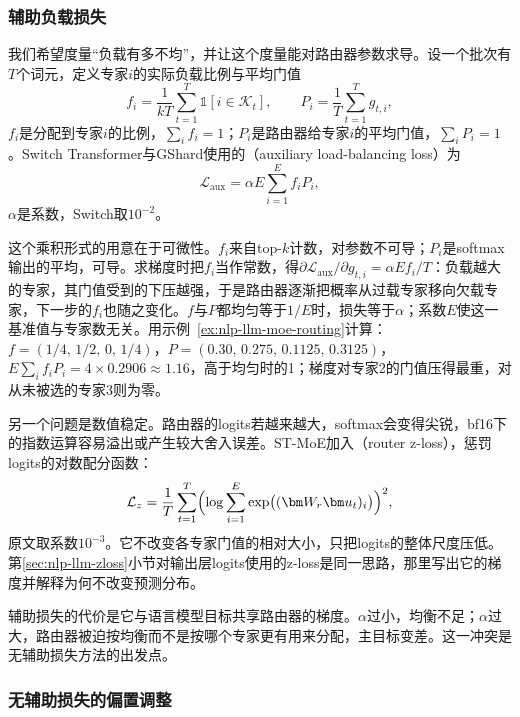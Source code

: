 \subsubsection{辅助负载损失}
\label{sec:nlp-llm-aux-loss}

我们希望度量“负载有多不均”，并让这个度量能对路由器参数求导。设一个批次有$T$个词元，定义专家$i$的实际负载比例与平均门值
\[
 f_i=\frac{1}{kT}\sum_{t=1}^{T}\mathbb 1[i\in\mathcal K_t],\qquad
 P_i=\frac1T\sum_{t=1}^{T}g_{t,i},
\]
$f_i$是分配到专家$i$的比例，$\sum_if_i=1$；$P_i$是路由器给专家$i$的平均门值，$\sum_iP_i=1$。Switch Transformer与GShard使用的（auxiliary load-balancing loss）为
\begin{equation}
 \mathcal L_{\mathrm{aux}}=\alpha E\sum_{i=1}^{E}f_iP_i ,
 \label{eq:nlp-llm-aux-loss}
\end{equation}
$\alpha$是系数，Switch取$10^{-2}$。

这个乘积形式的用意在于可微性。$f_i$来自top-$k$计数，对参数不可导；$P_i$是softmax输出的平均，可导。求梯度时把$f_i$当作常数，得$\partial\mathcal L_{\mathrm{aux}}/\partial g_{t,i}=\alpha Ef_i/T$：负载越大的专家，其门值受到的下压越强，于是路由器逐渐把概率从过载专家移向欠载专家，下一步的$f_i$也随之变化。$f$与$P$都均匀等于$1/E$时，损失等于$\alpha$；系数$E$使这一基准值与专家数无关。用示例~\ref{ex:nlp-llm-moe-routing}计算：$f=(1/4,\,1/2,\,0,\,1/4)$，$P=(0.30,\,0.275,\,0.1125,\,0.3125)$，$E\sum_if_iP_i=4\times0.2906\approx1.16$，高于均匀时的1；梯度对专家2的门值压得最重，对从未被选的专家3则为零。

另一个问题是数值稳定。路由器的logits若越来越大，softmax会变得尖锐，bf16下的指数运算容易溢出或产生较大舍入误差。ST-MoE加入（router z-loss），惩罚logits的对数配分函数：
\begin{equation}
 \mathcal L_{z}=\frac1T\sum_{t=1}^{T}\Bigl(\log\sum_{i=1}^{E}\exp\bigl((\bm W_r\bm u_t)_i\bigr)\Bigr)^2 ,
 \label{eq:nlp-llm-router-z-loss}
\end{equation}
原文取系数$10^{-3}$。它不改变各专家门值的相对大小，只把logits的整体尺度压低。第\ref{sec:nlp-llm-zloss}小节对输出层logits使用的z-loss是同一思路，那里写出它的梯度并解释为何不改变预测分布。

辅助损失的代价是它与语言模型目标共享路由器的梯度。$\alpha$过小，均衡不足；$\alpha$过大，路由器被迫按均衡而不是按哪个专家更有用来分配，主目标变差。这一冲突是无辅助损失方法的出发点。

\subsubsection{无辅助损失的偏置调整}
\label{sec:nlp-llm-bias-balance}

